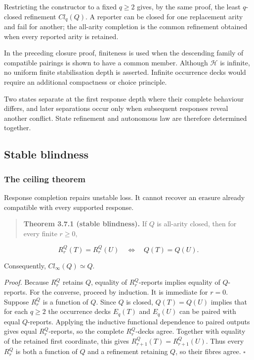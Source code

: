 \documentclass[11pt,a4paper]{article}
\begin{document}
Restricting the constructor to a fixed \(q \geq 2\) gives, by the same
proof, the least \(q\)-closed refinement \({Cl}_{q}(Q)\). A reporter can
be closed for one replacement arity and fail for another; the all-arity
completion is the common refinement obtained when every reported arity
is retained.

In the preceding closure proof, finiteness is used when the descending
family of compatible pairings is shown to have a common member. Although
\(\mathcal{H}\) is infinite, no uniform finite stabilisation depth is
asserted. Infinite occurrence decks would require an additional
compactness or choice principle.

Two states separate at the first response depth where their complete
behaviour differs, and later separations occur only when subsequent
responses reveal another conflict. State refinement and autonomous law
are therefore determined together.

\subsection{Stable blindness}

\subsubsection{The ceiling theorem}

Response completion repairs unstable loss. It cannot recover an erasure
already compatible with every supported response.

\begin{quote}
\textbf{Theorem 3.7.1 (stable blindness).} If \(Q\) is all-arity closed,
then for every finite \(r \geq 0\),
\end{quote}

\[\boxed{R_{r}^{Q}(T) = R_{r}^{Q}(U)\quad \Leftrightarrow \quad Q(T) = Q(U).}\]

Consequently, \({Cl}_{\infty}(Q) \simeq Q\).

\emph{Proof.} Because \(R_{r}^{Q}\) retains \(Q\), equality of
\(R_{r}^{Q}\)-reports implies equality of \(Q\)-reports. For the
converse, proceed by induction. It is immediate for \(r = 0\). Suppose
\(R_{r}^{Q}\) is a function of \(Q\). Since \(Q\) is closed,
\(Q(T) = Q(U)\) implies that for each \(q \geq 2\) the occurrence decks
\(E_{q}(T)\) and \(E_{q}(U)\) can be paired with equal \(Q\)-reports.
Applying the inductive functional dependence to paired outputs gives
equal \(R_{r}^{Q}\)-reports, so the complete \(R_{r}^{Q}\)-decks agree.
Together with equality of the retained first coordinate, this gives
\(R_{r + 1}^{Q}(T) = R_{r + 1}^{Q}(U)\). Thus every \(R_{r}^{Q}\) is
both a function of \(Q\) and a refinement retaining \(Q\), so their
fibres agree. \(\ensuremath{\square}\)
\end{document}

